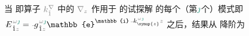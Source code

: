 当  即算子 $\mathcolor{gray}{k^\nabla_{\check{1}}}$ 中的 $\mathcolor{gray}{\nabla_z}$ 作用于  的试探解  的\textcolor{PineGreen}{每个（第$\textcolor{PineGreen}{\jmath}$个）模式}即 $
\Xint{\mathcolor{gray}{-}}{25}{E}^{\;\!\mathcolor{gray}{\omega} \textcolor{PineGreen}{\jmath}}_{\;\! \hat{1} \mathcolor{gray}{z}} = \Xint{{}^{}_{\mathcolor{gray}{-}}}{10}{g}^{\;\!\mathcolor{gray}{\omega} \textcolor{PineGreen}{\jmath}}_{\;\! \hat{1} \mathcolor{gray}{z}} \mathbb{e}^{\mathbb{i} \Xint{\begin{smallmatrix} ~ \\ {}^{}_{\mathcolor{gray}{-}} \\ ~ \end{smallmatrix}}{15}{k}_{\symup{z}}^{\;\! \mathcolor{gray}{\omega} \textcolor{PineGreen}{\jmath}} \mathcolor{gray}{z}}$ 之后，结果从  降阶为
